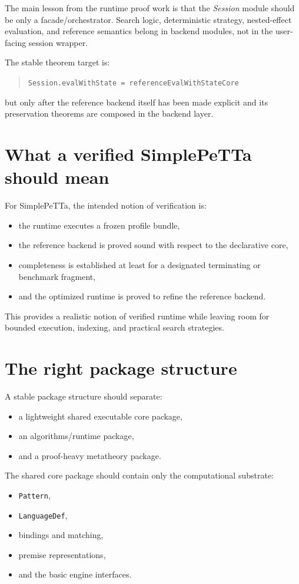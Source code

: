 \documentclass[11pt]{article}
\begin{document}
The main lesson from the runtime proof work is that the \emph{Session} module should be only a facade/orchestrator. Search logic, deterministic strategy, nested-effect evaluation, and reference semantics belong in backend modules, not in the user-facing session wrapper.

The stable theorem target is:

\begin{quote}
\texttt{Session.evalWithState = referenceEvalWithStateCore}
\end{quote}

but only after the reference backend itself has been made explicit and its preservation theorems are composed in the backend layer.

\section{What a verified SimplePeTTa should mean}

For SimplePeTTa, the intended notion of verification is:
\begin{itemize}
  \item the runtime executes a frozen profile bundle,
  \item the reference backend is proved sound with respect to the declarative core,
  \item completeness is established at least for a designated terminating or benchmark fragment,
  \item and the optimized runtime is proved to refine the reference backend.
\end{itemize}

This provides a realistic notion of verified runtime while leaving room for bounded execution, indexing, and practical search strategies.

\section{The right package structure}

A stable package structure should separate:
\begin{itemize}
  \item a lightweight shared executable core package,
  \item an algorithms/runtime package,
  \item and a proof-heavy metatheory package.
\end{itemize}

The shared core package should contain only the computational substrate:
\begin{itemize}
  \item \texttt{Pattern},
  \item \texttt{LanguageDef},
  \item bindings and matching,
  \item premise representations,
  \item and the basic engine interfaces.
\end{itemize}
\end{document}
